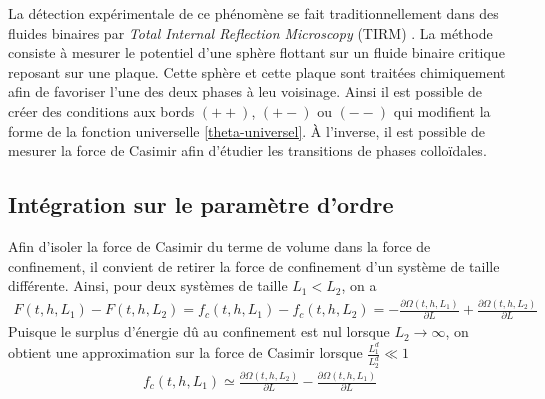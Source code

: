 La détection expérimentale de ce phénomène se fait traditionnellement dans des fluides binaires par \textit{Total Internal Reflection Microscopy} (TIRM) \cite{fukuto_critical_2005,hertlein_direct_2008,gambassi_critical_2009,edison_critical_2015-1}. La méthode consiste à mesurer le potentiel d'une sphère flottant sur un fluide binaire critique reposant sur une plaque. Cette sphère et cette plaque sont traitées chimiquement afin de favoriser l'une des deux phases à leu voisinage. Ainsi il est possible de créer des conditions aux bords $(++)$, $(+-)$ ou $(--)$ qui modifient la forme de la fonction universelle \ref{theta-universel}. À l'inverse, il est possible de mesurer la force de Casimir \cite{nguyen_controlling_2013} afin d'étudier les transitions de phases colloïdales.

    \subsection{Intégration sur le paramètre d'ordre}

Afin d'isoler la force de Casimir du terme de volume dans la force de confinement, il convient de retirer la force de confinement d'un système de taille différente. Ainsi, pour deux systèmes de taille $L_1 \less L_2$, on a 
\begin{align}
    F(t,h,L_1) - F(t,h,L_2) = f_c(t,h,L_1) - f_c(t,h,L_2) =  - \frac{\partial \Omega(t,h,L_1)}{\partial L}  + \frac{\partial \Omega(t,h,L_2)}{\partial L} 
\end{align}
Puisque le surplus d'énergie dû au confinement est nul lorsque $L_2\to \infty$, on obtient une approximation sur la force de Casimir lorsque $\frac{L_1^d}{L_2^d} \ll 1$ 
\begin{align}
    f_c(t,h,L_1) \simeq  \frac{\partial \Omega(t,h,L_2)}{\partial L}  - \frac{\partial \Omega(t,h,L_1)}{\partial L} 
    \label{casimir-diff-omega}   
\end{align}

